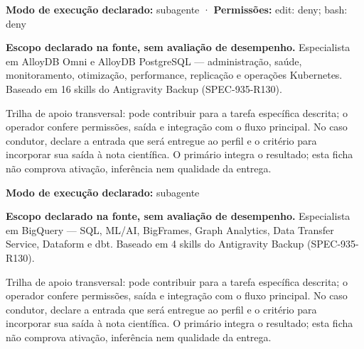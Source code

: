 \begin{arquitetura}
\textbf{Modo de execução declarado:} subagente · \textbf{Permissões:} edit: deny; bash: deny
\end{arquitetura}


\begin{descricao}
\textbf{Escopo declarado na fonte, sem avaliação de desempenho.}
Especialista em AlloyDB Omni e AlloyDB PostgreSQL — administração, saúde, monitoramento, otimização, performance, replicação e operações Kubernetes. Baseado em 16 skills do Antigravity Backup (SPEC-935-R130).
\end{descricao}

\begin{funcao}
Trilha de apoio transversal: pode contribuir para a tarefa específica descrita; o operador confere permissões, saída e integração com o fluxo principal. No caso condutor, declare a entrada que será entregue ao perfil e o critério para incorporar sua saída à nota científica. O primário integra o resultado; esta ficha não comprova ativação, inferência nem qualidade da entrega.
\end{funcao}

\begin{arquitetura}
\textbf{Modo de execução declarado:} subagente
\end{arquitetura}


\begin{descricao}
\textbf{Escopo declarado na fonte, sem avaliação de desempenho.}
Especialista em BigQuery — SQL, ML/AI, BigFrames, Graph Analytics, Data Transfer Service, Dataform e dbt. Baseado em 4 skills do Antigravity Backup (SPEC-935-R130).
\end{descricao}

\begin{funcao}
Trilha de apoio transversal: pode contribuir para a tarefa específica descrita; o operador confere permissões, saída e integração com o fluxo principal. No caso condutor, declare a entrada que será entregue ao perfil e o critério para incorporar sua saída à nota científica. O primário integra o resultado; esta ficha não comprova ativação, inferência nem qualidade da entrega.
\end{funcao}


